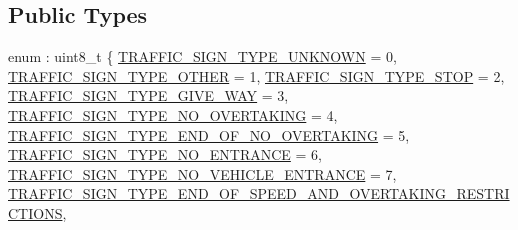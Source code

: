 \subsection*{Public Types}
\begin{DoxyCompactItemize}
\item 
enum \+: uint8\+\_\+t \{ \newline
\hyperlink{structmaf__perception__interface_1_1TrafficSignTypeEnum_a8ee58c73d02876bd45300f1f742212bca4618d4d5e4d877d675ebbb90f27b7a2a}{T\+R\+A\+F\+F\+I\+C\+\_\+\+S\+I\+G\+N\+\_\+\+T\+Y\+P\+E\+\_\+\+U\+N\+K\+N\+O\+WN} = 0, 
\hyperlink{structmaf__perception__interface_1_1TrafficSignTypeEnum_a8ee58c73d02876bd45300f1f742212bca15e0e7127efecafd8460c41fb285a9be}{T\+R\+A\+F\+F\+I\+C\+\_\+\+S\+I\+G\+N\+\_\+\+T\+Y\+P\+E\+\_\+\+O\+T\+H\+ER} = 1, 
\hyperlink{structmaf__perception__interface_1_1TrafficSignTypeEnum_a8ee58c73d02876bd45300f1f742212bca8d77d874e526b2033801c5e6edf0cf9b}{T\+R\+A\+F\+F\+I\+C\+\_\+\+S\+I\+G\+N\+\_\+\+T\+Y\+P\+E\+\_\+\+S\+T\+OP} = 2, 
\hyperlink{structmaf__perception__interface_1_1TrafficSignTypeEnum_a8ee58c73d02876bd45300f1f742212bcadc69f8c184743c2a42079af72eac85c7}{T\+R\+A\+F\+F\+I\+C\+\_\+\+S\+I\+G\+N\+\_\+\+T\+Y\+P\+E\+\_\+\+G\+I\+V\+E\+\_\+\+W\+AY} = 3, 
\newline
\hyperlink{structmaf__perception__interface_1_1TrafficSignTypeEnum_a8ee58c73d02876bd45300f1f742212bca7e8f03a544e66273bde85dacda1b84e7}{T\+R\+A\+F\+F\+I\+C\+\_\+\+S\+I\+G\+N\+\_\+\+T\+Y\+P\+E\+\_\+\+N\+O\+\_\+\+O\+V\+E\+R\+T\+A\+K\+I\+NG} = 4, 
\hyperlink{structmaf__perception__interface_1_1TrafficSignTypeEnum_a8ee58c73d02876bd45300f1f742212bca04e3dbeb9e2cf698de1e89f27ec65f6c}{T\+R\+A\+F\+F\+I\+C\+\_\+\+S\+I\+G\+N\+\_\+\+T\+Y\+P\+E\+\_\+\+E\+N\+D\+\_\+\+O\+F\+\_\+\+N\+O\+\_\+\+O\+V\+E\+R\+T\+A\+K\+I\+NG} = 5, 
\hyperlink{structmaf__perception__interface_1_1TrafficSignTypeEnum_a8ee58c73d02876bd45300f1f742212bcab0498babaad9c34c49f440cd7a0d7643}{T\+R\+A\+F\+F\+I\+C\+\_\+\+S\+I\+G\+N\+\_\+\+T\+Y\+P\+E\+\_\+\+N\+O\+\_\+\+E\+N\+T\+R\+A\+N\+CE} = 6, 
\hyperlink{structmaf__perception__interface_1_1TrafficSignTypeEnum_a8ee58c73d02876bd45300f1f742212bcad2ebf0d2ed8b45e8828ed06f3ab8d0bf}{T\+R\+A\+F\+F\+I\+C\+\_\+\+S\+I\+G\+N\+\_\+\+T\+Y\+P\+E\+\_\+\+N\+O\+\_\+\+V\+E\+H\+I\+C\+L\+E\+\_\+\+E\+N\+T\+R\+A\+N\+CE} = 7, 
\newline
\hyperlink{structmaf__perception__interface_1_1TrafficSignTypeEnum_a8ee58c73d02876bd45300f1f742212bca3a56579778adae315ac4b94b8d844d14}{T\+R\+A\+F\+F\+I\+C\+\_\+\+S\+I\+G\+N\+\_\+\+T\+Y\+P\+E\+\_\+\+E\+N\+D\+\_\+\+O\+F\+\_\+\+S\+P\+E\+E\+D\+\_\+\+A\+N\+D\+\_\+\+O\+V\+E\+R\+T\+A\+K\+I\+N\+G\+\_\+\+R\+E\+S\+T\+R\+I\+C\+T\+I\+O\+NS}, 

\end{DoxyCompactItemize}
